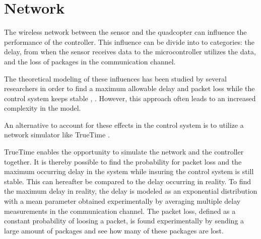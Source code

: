 \section{Network}
The wireless network between the sensor and the quadcopter can influence the performance of the controller. This influence can be divide into to categories: the delay, from when the sensor receives data to the microcontroller utilizes the data, and the loss of packages in the communication channel.


The theoretical modeling of these influences has been studied by several researchers in order to find a maximum allowable delay and packet loss while the control system keeps stable \cite{wang}, \cite{walsh}. However, this approach often leads to an increased complexity in the model. 

An alternative to account for these effects in the control system is to utilize a network simulator like TrueTime \cite{TrueTimeNew}.

TrueTime enables the opportunity to simulate the network and the controller together. It is thereby possible to find the probability for packet loss and the maximum occurring delay in the system while insuring the control system is still stable. This can hereafter be compared to the delay occurring in reality. To find the maximum delay in reality, the delay is modeled as an exponential distribution with a mean parameter obtained experimentally by averaging multiple delay measurements in the communication channel. The packet loss, defined as a constant probability of loosing a packet, is found experimentally by sending a large amount of packages and see how many of these packages are lost.  

